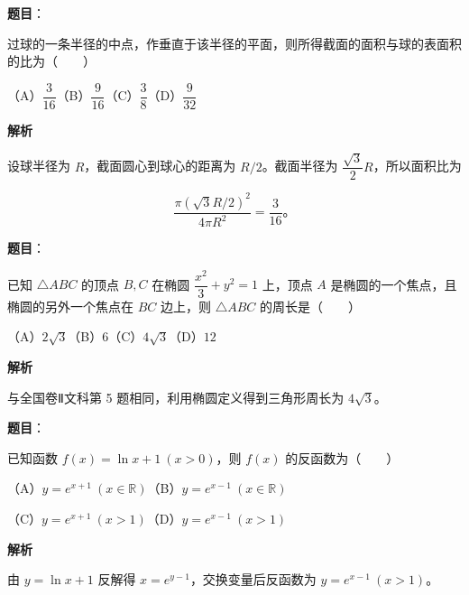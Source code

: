 \begin{answer}

\textbf{题目}：

过球的一条半径的中点，作垂直于该半径的平面，则所得截面的面积与球的表面积的比为\mbox{（　　）}

（A）$\dfrac3{16}$\quad（B）$\dfrac9{16}$\quad（C）$\dfrac38$\quad（D）$\dfrac9{32}$

\textbf{解析}

设球半径为 $R$，截面圆心到球心的距离为 $R/2$。截面半径为 $\dfrac{\sqrt3}{2}R$，所以面积比为

\nopagebreak[4]
\[
\frac{\pi(\sqrt3R/2)^2}{4\pi R^2}=\frac3{16}\text{。}
\]


\end{answer}
\begin{answer}

\textbf{题目}：

已知 $\triangle ABC$ 的顶点 $B,C$ 在椭圆 $\dfrac{x^2}{3}+y^2=1$ 上，顶点 $A$ 是椭圆的一个焦点，且椭圆的另外一个焦点在 $BC$ 边上，则 $\triangle ABC$ 的周长是\mbox{（　　）}

（A）$2\sqrt3$\quad（B）$6$\quad（C）$4\sqrt3$\quad（D）$12$

\textbf{解析}

与全国卷Ⅱ文科第 5 题相同，利用椭圆定义得到三角形周长为 $4\sqrt3$。


\end{answer}
\begin{answer}

\textbf{题目}：

已知函数 $f(x)=\ln x+1\ (x>0)$，则 $f(x)$ 的反函数为\mbox{（　　）}

（A）$y=e^{x+1}\ (x\in\mathbb R)$\quad（B）$y=e^{x-1}\ (x\in\mathbb R)$

（C）$y=e^{x+1}\ (x>1)$\quad（D）$y=e^{x-1}\ (x>1)$

\textbf{解析}

由 $y=\ln x+1$ 反解得 $x=e^{y-1}$，交换变量后反函数为 $y=e^{x-1}\ (x>1)$。


\end{answer}
